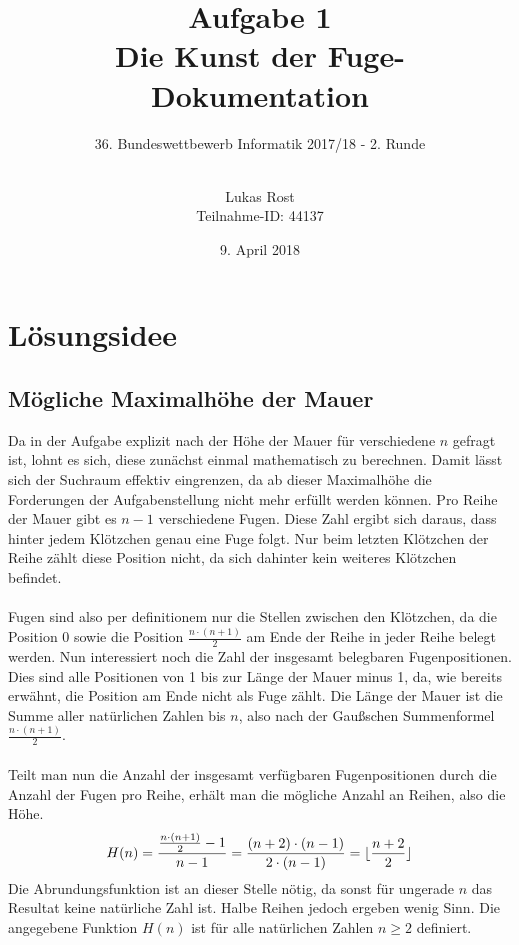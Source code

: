 \documentclass[a4paper, notitlepage, 12pt]{scrartcl}
\author{Lukas Rost \\ \small{Teilnahme-ID: 44137}}
\title{Aufgabe 1 \\ \glqq Die Kunst der Fuge\grqq  - Dokumentation}
\subtitle{36. Bundeswettbewerb Informatik 2017/18 - 2. Runde \\~\\}
\date{9. April 2018}
\DeclarePairedDelimiter\floor{\lfloor}{\rfloor}
\begin{document}
\renewcommand{\contentsname}{\centerline{Inhaltsverzeichnis}}
 \maketitle
 \tableofcontents
 \thispagestyle{empty}
 \newpage
 \setcounter{page}{1}
 
 \section{Lösungsidee}
 \subsection{Mögliche Maximalhöhe der Mauer}
 Da in der Aufgabe explizit nach der Höhe der Mauer für verschiedene $n$ gefragt ist, lohnt es sich, diese zunächst einmal mathematisch zu berechnen. Damit lässt sich der Suchraum effektiv eingrenzen, da ab dieser Maximalhöhe die Forderungen der Aufgabenstellung nicht mehr erfüllt werden können. Pro Reihe der Mauer gibt es $n-1$ verschiedene Fugen. Diese Zahl ergibt sich daraus, dass hinter jedem Klötzchen genau eine Fuge folgt. Nur beim letzten Klötzchen der Reihe zählt diese Position nicht, da sich dahinter kein weiteres Klötzchen befindet. \\ \\
Fugen sind also per definitionem nur die Stellen zwischen den Klötzchen, da die Position 0 sowie die Position $\frac{n \cdot (n+1) }{2}$ am Ende der Reihe in jeder Reihe belegt werden. Nun interessiert noch die Zahl der insgesamt belegbaren Fugenpositionen. Dies sind alle Positionen von 1 bis zur Länge der Mauer minus 1, da, wie bereits erwähnt, die Position am Ende nicht als Fuge zählt. Die Länge der Mauer ist die Summe aller natürlichen Zahlen bis $n$, also nach der Gaußschen Summenformel $\frac{n \cdot (n+1) }{2}$. \\ \\
Teilt man nun die Anzahl der insgesamt verfügbaren Fugenpositionen durch die Anzahl der Fugen pro Reihe, erhält man die mögliche Anzahl an Reihen, also die Höhe. 
\begin{equation}
H(n) = \frac{\frac{n \cdot (n+1) }{2} - 1}{n - 1} = \frac{(n + 2) \cdot (n - 1)}{2 \cdot (n - 1)} = \floor{\frac{n + 2}{2}}
\end{equation}
Die Abrundungsfunktion ist an dieser Stelle nötig, da sonst für ungerade $n$ das Resultat keine natürliche Zahl ist. Halbe Reihen jedoch ergeben wenig Sinn. Die angegebene Funktion $H(n)$ ist für alle natürlichen Zahlen $ n \geq 2$ definiert. \\ \\
\end{document}
